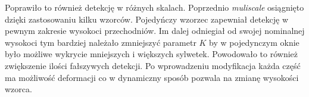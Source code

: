 Poprawiło to również detekcję w różnych skalach. Poprzednio \textit{muliscale} osiągnięto dzięki zastosowaniu kilku wzorców. Pojedyńczy wzorzec zapewniał detekcję w pewnym zakresie wysokoci przechodniów. Im dalej odniegiał od swojej nominalnej wysokoci tym bardziej należało zmniejszyć parametr $K$ by w pojedynczym oknie było możliwe wykrycie mniejszych i większych sylwetek. Powodowało to również zwiększenie ilości fałszywych detekcji. Po wprowadzeniu modyfikacja każda część ma możliwość deformacji co w dynamiczny sposób pozwala na zmianę wysokości wzorca.





